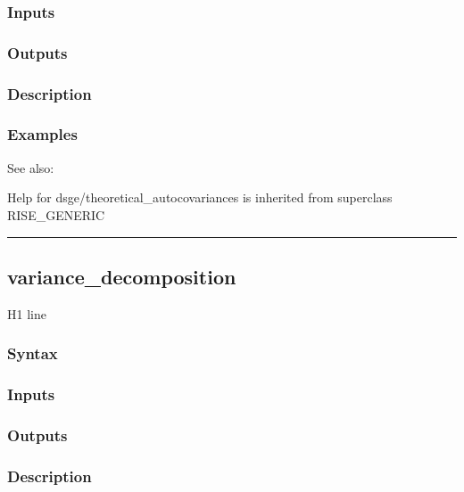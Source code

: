 \documentclass[letterpaper,10pt,english]{sphinxmanual}
\begin{document}
\subsubsection{Inputs}
\label{classes/models/@dsge/dsge:id205}

\subsubsection{Outputs}
\label{classes/models/@dsge/dsge:id206}

\subsubsection{Description}
\label{classes/models/@dsge/dsge:id207}

\subsubsection{Examples}
\label{classes/models/@dsge/dsge:id208}
See also:

Help for dsge/theoretical\_autocovariances is inherited from superclass RISE\_GENERIC


\bigskip\hrule{}\bigskip



\subsection{variance\_decomposition}
\label{classes/models/@dsge/dsge:id209}\label{classes/models/@dsge/dsge:variance-decomposition}
H1 line


\subsubsection{Syntax}
\label{classes/models/@dsge/dsge:id210}

\subsubsection{Inputs}
\label{classes/models/@dsge/dsge:id211}

\subsubsection{Outputs}
\label{classes/models/@dsge/dsge:id212}

\subsubsection{Description}
\label{classes/models/@dsge/dsge:id213}
\end{document}
